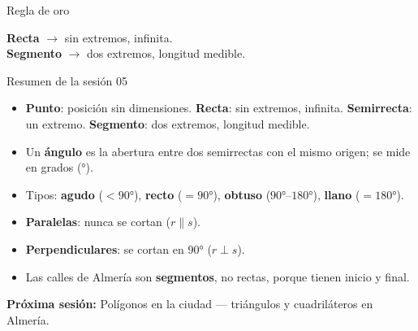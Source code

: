 \documentclass[aspectratio=169, 10pt, spanish]{beamer}
\begin{document}
\begin{frame}{Regla de oro}
  \begin{notabox}
    \AlmFontSmall
    \textbf{Recta} $\to$ sin extremos, infinita.\\[4pt]
    \textbf{Segmento} $\to$ dos extremos, longitud medible.
  \end{notabox}
  \vspace{10pt}
  \begin{center}
  \end{center}
\end{frame}

\begin{frame}{Resumen de la sesión 05}
  \begin{resumenbox}
    \begin{itemize}
      \item \textbf{Punto}: posición sin dimensiones. \textbf{Recta}: sin extremos, infinita. \textbf{Semirrecta}: un extremo. \textbf{Segmento}: dos extremos, longitud medible.
      \item Un \textbf{ángulo} es la abertura entre dos semirrectas
            con el mismo origen; se mide en grados (°).
      \item Tipos: \textbf{agudo} ($< 90°$),
            \textbf{recto} ($= 90°$),
            \textbf{obtuso} ($90°$--$180°$),
            \textbf{llano} ($= 180°$).
      \item \textbf{Paralelas}: nunca se cortan ($r \parallel s$).
      \item \textbf{Perpendiculares}: se cortan en 90° ($r \perp s$).
      \item Las calles de Almería son \textbf{segmentos},
            no rectas, porque tienen inicio y final.
    \end{itemize}
  \end{resumenbox}
  \vspace{6pt}
  \begin{center}
    {\AlmFontSmall\color{AlmAzulM}
    \faArrowCircleRight\enskip
    \textbf{Próxima sesión:}
    Polígonos en la ciudad — triángulos y cuadriláteros en Almería.}
  \end{center}
\end{frame}
\end{document}
